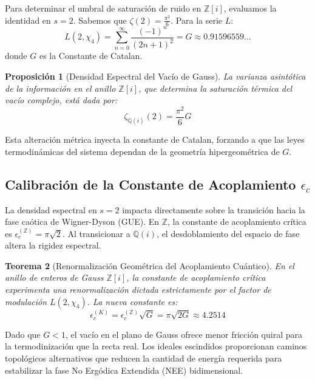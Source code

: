 \documentclass[12pt, a4paper]{article}
\theoremstyle{plain}
\newtheorem{teorema}{Teorema}[section]
\newtheorem{proposicion}[teorema]{Proposición}
\theoremstyle{definition}
\theoremstyle{remark}
\newcommand{\Z}{\mathbb{Z}}
\newcommand{\Q}{\mathbb{Q}}
\begin{document}
Para determinar el umbral de saturación de ruido en $\Z[i]$, evaluamos la identidad en $s=2$. Sabemos que $\zeta(2) = \frac{\pi^2}{6}$. Para la serie $L$:
\begin{equation}
    L(2, \chi_4) = \sum_{n=0}^{\infty} \frac{(-1)^n}{(2n+1)^2} = G \approx 0.91596559\dots
\end{equation}
donde $G$ es la Constante de Catalan.

\begin{proposicion}[Densidad Espectral del Vacío de Gauss]
La varianza asintótica de la información en el anillo $\Z[i]$, que determina la saturación térmica del vacío complejo, está dada por:
\begin{equation}
    \zeta_{\Q(i)}(2) = \frac{\pi^2}{6} G
\end{equation}
\end{proposicion}

Esta alteración métrica inyecta la constante de Catalan, forzando a que las leyes termodinámicas del sistema dependan de la geometría hipergeométrica de $G$.

\subsection{Calibración de la Constante de Acoplamiento \texorpdfstring{$\epsilon_c$}{epsilon\_c}}

La densidad espectral en $s=2$ impacta directamente sobre la transición hacia la fase caótica de Wigner-Dyson (GUE). En $\Z$, la constante de acoplamiento crítica es $\epsilon_c^{(\Z)} = \pi\sqrt{2}$. Al transicionar a $\Q(i)$, el desdoblamiento del espacio de fase altera la rigidez espectral.

\begin{teorema}[Renormalización Geométrica del Acoplamiento Cuántico]
\label{teo:acoplamiento_catalan}
En el anillo de enteros de Gauss $\Z[i]$, la constante de acoplamiento crítica experimenta una renormalización dictada estrictamente por el factor de modulación $L(2, \chi_4)$. La nueva constante es:
\begin{equation}
    \epsilon_c^{(K)} = \epsilon_c^{(\Z)} \sqrt{G} = \pi \sqrt{2G} \approx 4.2514
\end{equation}
\end{teorema}

Dado que $G < 1$, el vacío en el plano de Gauss ofrece menor fricción quiral para la termodinización que la recta real. Los ideales escindidos proporcionan caminos topológicos alternativos que reducen la cantidad de energía requerida para estabilizar la fase No Ergódica Extendida (NEE) bidimensional.
\end{document}
